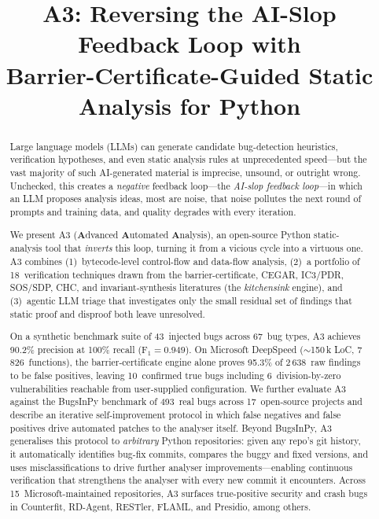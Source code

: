 \documentclass[sigconf,review,anonymous]{acmart}
\begin{document}
\title{A3: Reversing the AI-Slop Feedback Loop with\\Barrier-Certificate-Guided Static Analysis for Python}

\begin{abstract}
Large language models (LLMs) can generate candidate bug-detection heuristics, verification hypotheses, and even static analysis rules at unprecedented speed---but the vast majority of such AI-generated material is imprecise, unsound, or outright wrong.
Unchecked, this creates a \emph{negative} feedback loop---the \emph{AI-slop feedback loop}---in which an LLM proposes analysis ideas, most are noise, that noise pollutes the next round of prompts and training data, and quality degrades with every iteration.

We present \textsc{A3} (\textbf{A}dvanced \textbf{A}utomated \textbf{A}nalysis), an open-source Python static-analysis tool that \emph{inverts} this loop, turning it from a vicious cycle into a virtuous one.
\textsc{A3} combines (1)~bytecode-level control-flow and data-flow analysis, (2)~a portfolio of 18~verification techniques drawn from the barrier-certificate, CEGAR, IC3/PDR, SOS/SDP, CHC, and invariant-synthesis literatures (the \emph{kitchensink} engine), and (3)~agentic LLM triage that investigates only the small residual set of findings that static proof and disproof both leave unresolved.

On a synthetic benchmark suite of 43~injected bugs across 67~bug types, \textsc{A3} achieves 90.2\% precision at 100\% recall (F$_1 = 0.949$).
On Microsoft DeepSpeed ($\sim$150\,k LoC, 7\,826~functions), the barrier-certificate engine alone proves 95.3\% of 2\,638~raw findings to be false positives, leaving 10~confirmed true bugs including 6~division-by-zero vulnerabilities reachable from user-supplied configuration.
We further evaluate \textsc{A3} against the BugsInPy benchmark of 493~real bugs across 17~open-source projects and describe an iterative self-improvement protocol in which false negatives and false positives drive automated patches to the analyser itself.
Beyond BugsInPy, \textsc{A3} generalises this protocol to \emph{arbitrary} Python repositories: given any repo's git history, it automatically identifies bug-fix commits, compares the buggy and fixed versions, and uses misclassifications to drive further analyser improvements---enabling continuous verification that strengthens the analyser with every new commit it encounters.
Across 15~Microsoft-maintained repositories, \textsc{A3} surfaces true-positive security and crash bugs in Counterfit, RD-Agent, RESTler, FLAML, and Presidio, among others.
\end{abstract}
\end{document}
